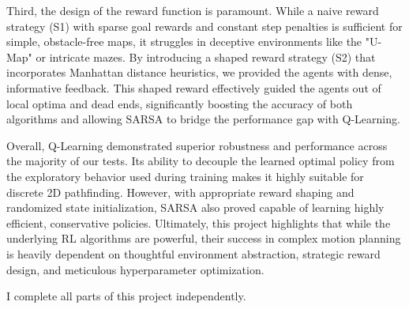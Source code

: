 \documentclass{article}
\begin{document}
Third, the design of the reward function is paramount. While a naive reward strategy (S1) with sparse goal rewards and constant step penalties is sufficient for simple, obstacle-free maps, it struggles in deceptive environments like the "U-Map" or intricate mazes. By introducing a shaped reward strategy (S2) that incorporates Manhattan distance heuristics, we provided the agents with dense, informative feedback. This shaped reward effectively guided the agents out of local optima and dead ends, significantly boosting the accuracy of both algorithms and allowing SARSA to bridge the performance gap with Q-Learning.

Overall, Q-Learning demonstrated superior robustness and performance across the majority of our tests. Its ability to decouple the learned optimal policy from the exploratory behavior used during training makes it highly suitable for discrete 2D pathfinding. However, with appropriate reward shaping and randomized state initialization, SARSA also proved capable of learning highly efficient, conservative policies. Ultimately, this project highlights that while the underlying RL algorithms are powerful, their success in complex motion planning is heavily dependent on thoughtful environment abstraction, strategic reward design, and meticulous hyperparameter optimization.

I complete all parts of this project independently.
\end{document}
